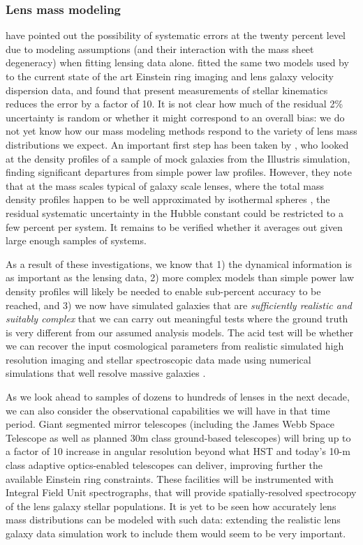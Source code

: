 \subsubsection{Lens mass modeling}

\citet{S+S13} have pointed out the possibility of systematic errors at
the twenty percent level due to modeling assumptions (and their
interaction with the mass sheet degeneracy) when fitting lensing data
alone.
\citet{Suy++14} fitted the same two models used by
\citet{S+S13}  to the current state of the art Einstein ring imaging and
lens galaxy velocity dispersion data, and found that present
measurements of stellar kinematics reduces the error by a factor of
10.  It is not clear how much of the residual 2\% uncertainty is
random or whether it might correspond to an overall bias: we do not
yet know how our mass modeling methods respond to the variety of lens
mass distributions we expect. An important first step has been taken
by \citet{XuEtal2016}, who looked at the density profiles of a sample
of mock galaxies from the Illustris simulation, finding significant
departures from simple power law profiles. However, they note that at
the mass scales typical of galaxy scale lenses, where the total mass
density profiles happen to be well approximated by isothermal spheres
\citep{Koo++09,Aug++10}, the residual systematic uncertainty 
in the Hubble constant could be restricted to a few percent per
system. It remains to be verified whether it averages out given large
enough samples of systems.

As a result of these investigations, we know that 1) the dynamical
information is as important as the lensing data, 2) more complex
models than simple power law density profiles will likely be needed to
enable sub-percent accuracy to be reached, and 3) we now have
simulated galaxies that are {\it sufficiently realistic and suitably
complex} that we can carry out meaningful tests where the ground truth
is very different from our assumed analysis models. The acid test will
be whether we can recover the input cosmological parameters from
realistic simulated high resolution imaging and stellar spectroscopic
data made using numerical simulations that well resolve massive
galaxies \citep[e.g.,][]{Fia++16}.

As we look ahead to samples of dozens to hundreds of lenses in the
next decade, we can also consider the observational capabilities we
will have in that time period. Giant segmented mirror telescopes
(including the James Webb Space Telescope as well as planned 30m class
ground-based telescopes) will bring up to a factor of 10 increase in
angular resolution beyond what HST and today's 10-m class adaptive
optics-enabled telescopes can deliver, improving further the available
Einstein ring constraints. These facilities will be instrumented with
Integral Field Unit spectrographs, that will provide
spatially-resolved spectrocopy of the lens galaxy stellar populations.
It is yet to be seen how accurately lens mass distributions can be
modeled with such data: extending the realistic lens galaxy data
simulation work to include them would seem to be very important.

